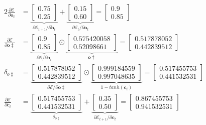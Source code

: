 \documentclass[xcolor={table}]{beamer}
\begin{document}
 \begin{frame} 
\begin{alignat}{2}
	 \frac{\partial \mathcal{E}}{\partial \mathbf{o}_t}&=\underbrace{\begin{bmatrix} 0.75\\ 0.25\end{bmatrix}}_{\partial \mathcal{E}_{t{+}1}/\partial \mathbf{h}_t} + \underbrace{\begin{bmatrix} 0.15\\ 0.60 \end{bmatrix}}_{\partial \mathcal{E}_{t}/\partial \mathbf{o}_t}  = \begin{bmatrix} 0.9\\ 0.85 \end{bmatrix} \label{eqn:exampleeotgrad}\\
	 \frac{\partial \mathcal{E}}{\partial \mathbf{o\ddagger}}&= \underbrace{\begin{bmatrix} 0.9\\ 0.85 \end{bmatrix}}_{\partial \mathcal{E}/\partial \mathbf{o}_t} \odot \underbrace{\begin{bmatrix}  0.575420058\\ 0.52098661 \end{bmatrix}}_{\mathbf{o\dagger}}  = \begin{bmatrix}0.517878052\\ 0.442839512\end{bmatrix} \\
	 \delta_{o\ddagger}& = \underbrace{\begin{bmatrix}0.517878052\\ 0.442839512\end{bmatrix}}_{\partial \mathcal{E}/\partial \mathbf{o\ddagger}} \odot \underbrace{\begin{bmatrix} 0.999184559\\ 0.997048635 \end{bmatrix}}_{1-tanh(\mathbf{c}_t)} = \begin{bmatrix} 0.517455753\\ 0.441532531 \end{bmatrix}\\
	 \frac{\partial \mathcal{E}}{\partial \mathbf{c}_t} &= \underbrace{\begin{bmatrix} 0.517455753\\ 0.441532531 \end{bmatrix}}_{\delta_{o\ddagger}} + \underbrace{\begin{bmatrix} 0.35\\ 0.50\end{bmatrix}}_{\partial \mathcal{E}_{t{+}1}/\partial \mathbf{c}_t}  = \begin{bmatrix} 0.867455753\\ 0.941532531 \end{bmatrix} \label{eqn:gradECTexample}
\end{alignat}
\end{frame} 
\end{document}
